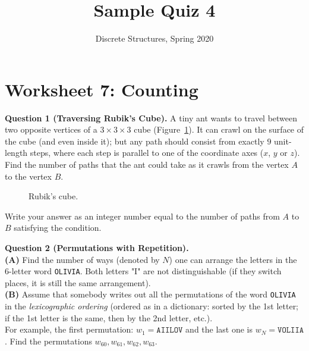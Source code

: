 \documentclass[jou]{apa6}
\title{Sample Quiz 4}
\author{Discrete Structures, Spring 2020}
\affiliation{RBS}
\begin{document}

\twocolumn
\section{Worksheet 7: Counting}

\vspace{10pt}
{\bf Question 1 (Traversing Rubik's Cube).} A tiny ant wants to travel 
between two opposite vertices of a $3 \times 3 \times 3$ cube (Figure~\ref{fig:rubiks-cube}). It can crawl
on the surface of the cube (and even inside it); 
but any path should consist from exactly $9$ unit-length
steps, where each step is parallel to one of the coordinate axes ($x$, $y$ or $z$). 
Find the number of paths that the ant could take as it crawls from the vertex $A$ to the vertex $B$. 

\begin{figure}[!htb]
\caption{\label{fig:rubiks-cube} Rubik's cube.}
\end{figure}


Write your answer as an integer number equal to the number of paths from $A$ to $B$ satisfying the condition.






\vspace{6pt}
{\bf Question 2 (Permutations with Repetition).}\\
{\bf (A)} Find the number of ways (denoted by $N$) one can arrange the letters in the 6-letter word {\tt OLIVIA}. 
Both letters "I" are not distinguishable (if they switch places, it is still the same arrangement).\\
{\bf (B)} Assume that somebody writes out all the permutations of the word {\tt OLIVIA} 
in the {\em lexicographic ordering} (ordered as in a dictionary: sorted by the 1st letter; 
if the 1st letter is the same, then by the 2nd letter, etc.).\\
For example, the first permutation: $w_1 = \mathtt{AIILOV}$ and the last one is $w_N = \mathtt{VOLIIA}$. 
Find the permutations $w_{60},w_{61},w_{62},w_{63}$. 
\end{document}
